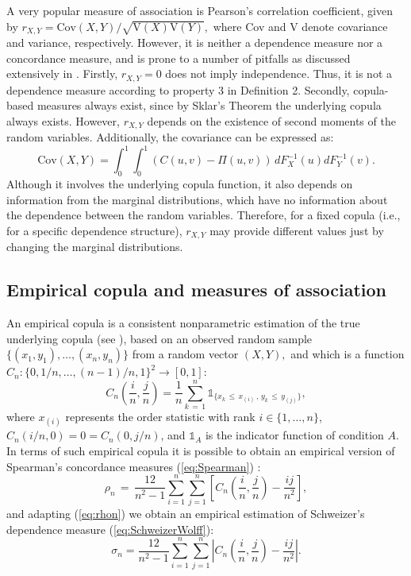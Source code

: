 \documentclass[journal]{vgtc}                %
\begin{document}
A very popular measure of association is
Pearson's correlation coefficient, given by $r_{X,Y}=\mbox{Cov}(X,Y)/\sqrt{\mbox{V}(X)\mbox{V}(Y)},$ where Cov and V denote covariance and variance, respectively. However, it is neither a dependence measure nor a concordance measure, and is prone to a number of pitfalls as discussed extensively in \cite{Embrechts2002}. Firstly, $r_{X,Y} = 0$ does not imply independence. Thus, it is not a dependence measure according to property 3 in Definition 2. Secondly, copula-based measures always exist, since by Sklar's Theorem the underlying copula always exists. However, $r_{X,Y}$ depends on the existence of second moments of the random variables. Additionally, the covariance can be expressed as: $$\mbox{Cov}(X,Y)=\int_0^1\!\!\!\int_0^1(C(u,v)-\Pi(u,v))\,dF_X^{-1}(u)dF_Y^{-1}(v).$$
Although it involves the underlying copula function, it also depends on information from the marginal distributions, which have no information about the dependence between the random variables. Therefore, for a fixed copula (i.e., for a specific dependence structure), $r_{X,Y}$ may provide different values just by changing the marginal distributions.


\subsection{Empirical copula and measures of association}

An empirical copula is a consistent nonparametric estimation of the true underlying copula (see \cite{Deheuvels1979}), based on an observed random sample $\{(x_1,y_1),\ldots,(x_n,y_n)\}$ from a random vector $(X,Y),$ and which is a function $C_n:\{0,1/n,\ldots,(n-1)/n,1\}^2\rightarrow[0,1]$:
\begin{equation}\label{eq:copem}
    C_n\left(\frac{i}{n},\frac{j}{n}\right) = \frac{1}{n}\sum_{k\,=\,1}^n \mathbb{1}_{\{x_k\,\leq\,x_{(i)}\,,\,y_k\,\leq\,y_{(j)}\}},
\end{equation}
where $x_{(i)}$ represents the order statistic with rank $i\in\{1,\ldots,n\}$, $C_n(i/n,0) = 0 = C_n(0,j/n)$, and $\mathbb{1}_A$ is the indicator function of condition $A$. In terms of such empirical copula it is possible to obtain an empirical version of Spearman's concordance measures (\ref{eq:Spearman}) \cite{Nelsen1999}:
\begin{equation}\label{eq:rhon}
    \rho_n \,=\, \frac{12}{n^2-1}\sum_{i=1}^n\sum_{j=1}^n\left[C_n\left(\frac{i}{n},\frac{j}{n}\right)-\frac{ij}{n^2}\right],
\end{equation}
and adapting (\ref{eq:rhon}) we obtain an empirical estimation of Schweizer's dependence measure (\ref{eq:SchweizerWolff}):
\begin{equation}\label{eq:sigman}
    \sigma_n = \frac{12}{n^2-1}\sum_{i=1}^n\sum_{j=1}^n\left|C_n\left(\frac{i}{n},\frac{j}{n}\right)-\frac{ij}{n^2}\right|.
\end{equation}
\end{document}
